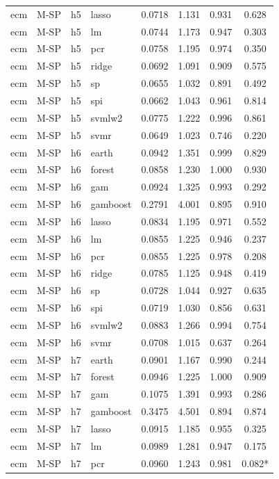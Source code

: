 \begin{ThreePartTable}
\begin{longtable}[t]{llclcccc}
ecm & M-SP & h5 & lasso & 0.0718 & 1.131 & 0.931 & 0.628\\
ecm & M-SP & h5 & lm & 0.0744 & 1.173 & 0.947 & 0.303\\
ecm & M-SP & h5 & pcr & 0.0758 & 1.195 & 0.974 & 0.350\\
ecm & M-SP & h5 & ridge & 0.0692 & 1.091 & 0.909 & 0.575\\
ecm & M-SP & h5 & sp & 0.0655 & 1.032 & 0.891 & 0.492\\
ecm & M-SP & h5 & spi & 0.0662 & 1.043 & 0.961 & 0.814\\
ecm & M-SP & h5 & svmlw2 & 0.0775 & 1.222 & 0.996 & 0.861\\
ecm & M-SP & h5 & svmr & 0.0649 & 1.023 & 0.746 & 0.220\\
\addlinespace
ecm & M-SP & h6 & earth & 0.0942 & 1.351 & 0.999 & 0.829\\
ecm & M-SP & h6 & forest & 0.0858 & 1.230 & 1.000 & 0.930\\
ecm & M-SP & h6 & gam & 0.0924 & 1.325 & 0.993 & 0.292\\
ecm & M-SP & h6 & gamboost & 0.2791 & 4.001 & 0.895 & 0.910\\
ecm & M-SP & h6 & lasso & 0.0834 & 1.195 & 0.971 & 0.552\\
ecm & M-SP & h6 & lm & 0.0855 & 1.225 & 0.946 & 0.237\\
ecm & M-SP & h6 & pcr & 0.0855 & 1.225 & 0.978 & 0.208\\
ecm & M-SP & h6 & ridge & 0.0785 & 1.125 & 0.948 & 0.419\\
ecm & M-SP & h6 & sp & 0.0728 & 1.044 & 0.927 & 0.635\\
ecm & M-SP & h6 & spi & 0.0719 & 1.030 & 0.856 & 0.631\\
ecm & M-SP & h6 & svmlw2 & 0.0883 & 1.266 & 0.994 & 0.754\\
ecm & M-SP & h6 & svmr & 0.0708 & 1.015 & 0.637 & 0.264\\
\addlinespace
ecm & M-SP & h7 & earth & 0.0901 & 1.167 & 0.990 & 0.244\\
ecm & M-SP & h7 & forest & 0.0946 & 1.225 & 1.000 & 0.909\\
ecm & M-SP & h7 & gam & 0.1075 & 1.391 & 0.993 & 0.286\\
ecm & M-SP & h7 & gamboost & 0.3475 & 4.501 & 0.894 & 0.874\\
ecm & M-SP & h7 & lasso & 0.0915 & 1.185 & 0.955 & 0.325\\
ecm & M-SP & h7 & lm & 0.0989 & 1.281 & 0.947 & 0.175\\
ecm & M-SP & h7 & pcr & 0.0960 & 1.243 & 0.981 & 0.082*\\

\end{longtable}
\end{ThreePartTable}
